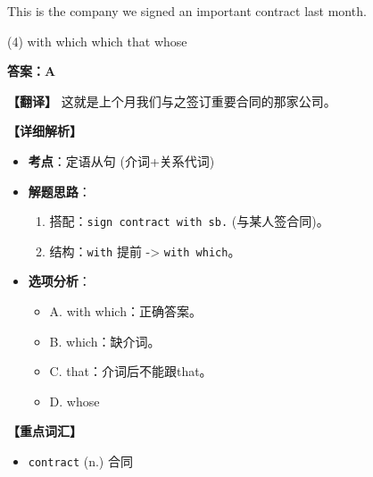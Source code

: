 \documentclass[11pt, a4paper]{article}
\newcommand{\analysis}[4]{
    \begin{solutionbox}
        \textbf{答案：#1}
        
        \textbf{【翻译】} #2
        
        \textbf{【详细解析】}
        #3
        
        \textbf{【重点词汇】}
        #4
    \end{solutionbox}
}
\newcommand{\blank}{\underline{\hspace{1.5cm}}}
\begin{document}
\begin{questions}
    \item This is the company \blank we signed an important contract last month.
    \begin{tasks}(4)
        \task with which \task which \task that \task whose
    \end{tasks}
    \analysis{A}{这就是上个月我们与之签订重要合同的那家公司。}{
        \begin{itemize}
            \item \textbf{考点}：定语从句 (介词+关系代词)
            \item \textbf{解题思路}：
                \begin{enumerate}
                    \item 搭配：\texttt{sign contract with sb.} (与某人签合同)。
                    \item 结构：\texttt{with} 提前 -> \texttt{with which}。
                \end{enumerate}
            \item \textbf{选项分析}：
                \begin{itemize}
                    \item A. with which：正确答案。
                    \item B. which：缺介词。
                    \item C. that：介词后不能跟that。
                    \item D. whose
                \end{itemize}
        \end{itemize}
    }{
        \begin{itemize}
            \item \texttt{contract} (n.) 合同
        \end{itemize}
    }


\end{questions}
\end{document}
